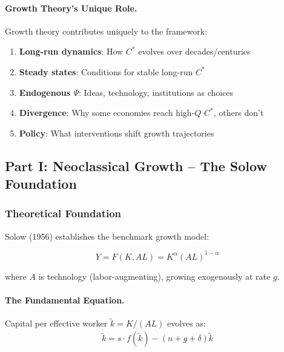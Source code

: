 \paragraph{Growth Theory's Unique Role.}
Growth theory contributes uniquely to the framework:
\begin{enumerate}
    \item \textbf{Long-run dynamics}: How $C^*$ evolves over decades/centuries
    \item \textbf{Steady states}: Conditions for stable long-run $C^*$
    \item \textbf{Endogenous $\Psi$}: Ideas, technology, institutions as choices
    \item \textbf{Divergence}: Why some economies reach high-$Q$ $C^*$, others don't
    \item \textbf{Policy}: What interventions shift growth trajectories
\end{enumerate}

\subsection{Part I: Neoclassical Growth – The Solow Foundation}

\subsubsection{Theoretical Foundation}

Solow (1956) establishes the benchmark growth model:

\begin{equation}
\boxed{
Y = F(K, AL) = K^\alpha (AL)^{1-\alpha}
}
\label{eq:solow-production}
\end{equation}

where $A$ is technology (labor-augmenting), growing exogenously at rate $g$.

\paragraph{The Fundamental Equation.}
Capital per effective worker $\tilde{k} = K/(AL)$ evolves as:
\begin{equation}
\dot{\tilde{k}} = s \cdot f(\tilde{k}) - (n + g + \delta) \tilde{k}
\end{equation}

